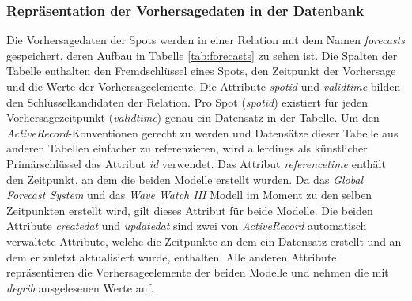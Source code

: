 \subsubsection{Repräsentation der Vorhersagedaten in der Datenbank}
Die Vorhersagedaten der Spots werden in einer Relation mit dem Namen
\textit{forecasts} gespeichert, deren Aufbau in Tabelle
\ref{tab:forecasts} zu sehen ist. Die Spalten der Tabelle enthalten
den Fremdschlüssel eines Spots, den Zeitpunkt der Vorhersage und die
Werte der Vorhersageelemente. Die Attribute
\textit{spot\textunderscore id} und \textit{valid\textunderscore time}
bilden den Schlüsselkandidaten der Relation. Pro Spot
(\textit{spot\textunderscore id}) existiert für jeden
Vorhersagezeitpunkt (\textit{valid\textunderscore time}) genau ein
Datensatz in der Tabelle. Um den \textit{ActiveRecord}-Konventionen
gerecht zu werden und Datensätze dieser Tabelle aus anderen Tabellen
einfacher zu referenzieren, wird allerdings als künstlicher
Primärschlüssel das Attribut \textit{id} verwendet. Das Attribut
\textit{reference\textunderscore time} enthält den Zeitpunkt, an dem
die beiden Modelle erstellt wurden. Da das \textit{Global Forecast
  System} und das \textit{Wave Watch III} Modell im Moment zu den
selben Zeitpunkten erstellt wird, gilt dieses Attribut für beide
Modelle. Die beiden Attribute \textit{created\textunderscore at} und
\textit{updated\textunderscore at} sind zwei von \textit{ActiveRecord}
automatisch verwaltete Attribute, welche die Zeitpunkte an dem ein
Datensatz erstellt und an dem er zuletzt aktualisiert wurde,
enthalten. Alle anderen Attribute repräsentieren die
Vorhersageelemente der beiden Modelle und nehmen die mit
\textit{degrib} ausgelesenen Werte auf.

